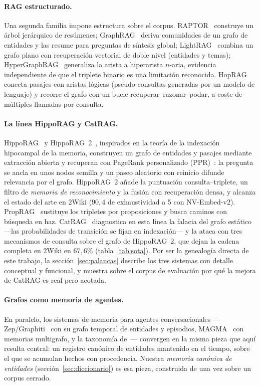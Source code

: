 \documentclass[11pt,a4paper]{article}
\begin{document}
\paragraph{RAG estructurado.}
Una segunda familia impone estructura sobre el corpus.
RAPTOR~\cite{raptor} construye un árbol jerárquico de resúmenes;
GraphRAG~\cite{graphrag} deriva comunidades de un grafo de entidades y las
resume para preguntas de síntesis global; LightRAG~\cite{lightrag} combina
un grafo plano con recuperación vectorial de doble nivel (entidades y
temas); HyperGraphRAG~\cite{hypergraphrag} generaliza la arista a
hiperarista $n$-aria, evidencia independiente de que el triplete binario es
una limitación reconocida. HopRAG~\cite{hoprag} conecta pasajes con aristas
lógicas (pseudo-consultas generadas por un modelo de lenguaje) y recorre el
grafo con un bucle recuperar--razonar--podar, a coste de múltiples llamadas
por consulta.

\paragraph{La línea HippoRAG y CatRAG.}
HippoRAG~\cite{hipporag} y HippoRAG~2~\cite{hipporag2}, inspirados en la
teoría de la indexación hipocampal de la memoria, construyen un grafo de
entidades y pasajes mediante extracción abierta y recuperan con PageRank
personalizado (PPR)~\cite{pprsurvey}: la pregunta se ancla en unos nodos
semilla y un paseo aleatorio con reinicio difunde relevancia por el grafo.
HippoRAG~2 añade la puntuación consulta--triplete, un filtro de
\emph{memoria de reconocimiento} y la fusión con recuperación densa, y
alcanza el estado del arte en 2Wiki ($90{,}4$ de exhaustividad a 5 con
NV-Embed-v2). PropRAG~\cite{proprag} sustituye los tripletes por
proposiciones y busca caminos con búsqueda en haz. CatRAG~\cite{catrag}
diagnostica en esta línea la \guillemotleft{}falacia del grafo estático\guillemotright{}
---las probabilidades de transición se fijan en indexación--- y la ataca
con tres mecanismos de consulta sobre el grafo de HippoRAG~2, que dejan
la cadena completa en 2Wiki en $67{,}6\%$ (tabla~\ref{tab:sota}). Por
ser la genealogía directa de este trabajo, la sección~\ref{sec:palancas}
describe los tres sistemas con detalle conceptual y funcional, y muestra
sobre el corpus de evaluación por qué la mejora de CatRAG es real pero
acotada.

\paragraph{Grafos como memoria de agentes.}
En paralelo, los sistemas de memoria para agentes conversacionales
---Zep/Graphiti~\cite{zep} con su grafo temporal de entidades y episodios,
MAGMA~\cite{magma} con memorias multigrafo, y la taxonomía
de~\cite{agentmemory}--- convergen en la misma pieza que aquí resulta
central: un registro canónico de entidades mantenido en el tiempo, sobre el
que se acumulan hechos con procedencia. Nuestra \emph{memoria canónica de
entidades} (sección~\ref{sec:diccionario}) es esa pieza, construida de una
vez sobre un corpus cerrado.
\end{document}
